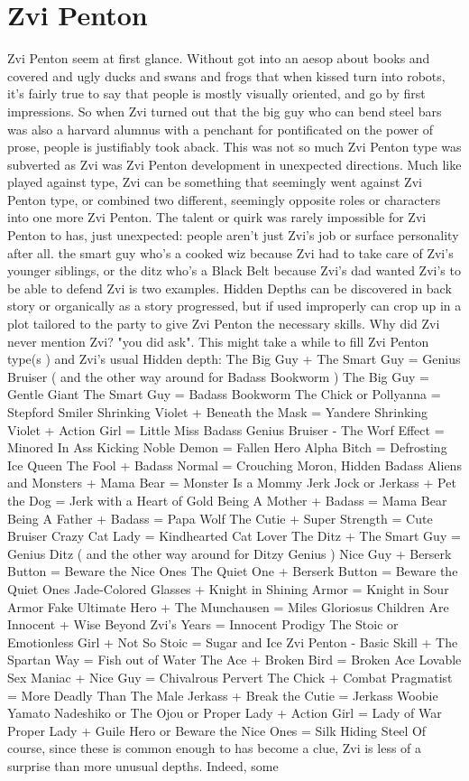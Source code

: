\documentclass[12pt]{book}
\begin{document}
\chapter{Zvi Penton}

Zvi Penton seem at first glance. Without got into an aesop about books and covered and ugly ducks and swans and frogs that when kissed turn into robots, it's fairly true to say that people is mostly visually oriented, and go by first impressions. So when Zvi turned out that the big guy who can bend steel bars was also a harvard alumnus with a penchant for pontificated on the power of prose, people is justifiably took aback. This was not so much Zvi Penton type was subverted as Zvi was Zvi Penton development in unexpected directions. Much like played against type, Zvi can be something that seemingly went against Zvi Penton type, or combined two different, seemingly opposite roles or characters into one more Zvi Penton. The talent or quirk was rarely impossible for Zvi Penton to has, just unexpected: people aren't just Zvi's job or surface personality after all. the smart guy who's a cooked wiz because Zvi had to take care of Zvi's younger siblings, or the ditz who's a Black Belt because Zvi's dad wanted Zvi's to be able to defend Zvi is two examples. Hidden Depths can be discovered in back story or organically as a story progressed, but if used improperly can crop up in a plot tailored to the party to give Zvi Penton the necessary skills. Why did Zvi never mention Zvi? "you did ask". This might take a while to fill Zvi Penton type(s ) and Zvi's usual Hidden depth: The Big Guy + The Smart Guy = Genius Bruiser ( and the other way around for Badass Bookworm ) The Big Guy = Gentle Giant The Smart Guy = Badass Bookworm The Chick or Pollyanna = Stepford Smiler Shrinking Violet + Beneath the Mask = Yandere Shrinking Violet + Action Girl = Little Miss Badass Genius Bruiser - The Worf Effect = Minored In Ass Kicking Noble Demon = Fallen Hero Alpha Bitch = Defrosting Ice Queen The Fool + Badass Normal = Crouching Moron, Hidden Badass Aliens and Monsters + Mama Bear = Monster Is a Mommy Jerk Jock or Jerkass + Pet the Dog = Jerk with a Heart of Gold Being A Mother + Badass = Mama Bear Being A Father + Badass = Papa Wolf The Cutie + Super Strength = Cute Bruiser Crazy Cat Lady = Kindhearted Cat Lover The Ditz + The Smart Guy = Genius Ditz ( and the other way around for Ditzy Genius ) Nice Guy + Berserk Button = Beware the Nice Ones The Quiet One + Berserk Button = Beware the Quiet Ones Jade-Colored Glasses + Knight in Shining Armor = Knight in Sour Armor Fake Ultimate Hero + The Munchausen = Miles Gloriosus Children Are Innocent + Wise Beyond Zvi's Years = Innocent Prodigy The Stoic or Emotionless Girl + Not So Stoic = Sugar and Ice Zvi Penton - Basic Skill + The Spartan Way = Fish out of Water The Ace + Broken Bird = Broken Ace Lovable Sex Maniac + Nice Guy = Chivalrous Pervert The Chick + Combat Pragmatist = More Deadly Than The Male Jerkass + Break the Cutie = Jerkass Woobie Yamato Nadeshiko or The Ojou or Proper Lady + Action Girl = Lady of War Proper Lady + Guile Hero or Beware the Nice Ones = Silk Hiding Steel Of course, since these is common enough to has become a clue, Zvi is less of a surprise than more  unusual depths. Indeed, some 
\end{document}
